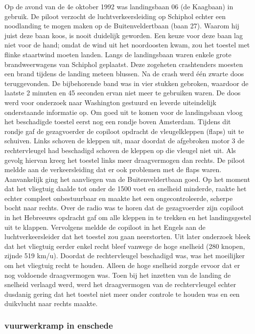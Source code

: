 Op de avond van de 4e oktober 1992 was landingsbaan 06 (de Kaagbaan) in gebruik. De piloot verzocht de luchtverkeersleiding op Schiphol echter een noodlanding te mogen maken op de Buitenveldertbaan (baan 27). Waarom hij juist deze baan koos, is nooit duidelijk geworden. Een keuze voor deze baan lag niet voor de hand; omdat de wind uit het noordoosten kwam, zou het toestel met flinke staartwind moeten landen. Langs de landingsbaan waren enkele grote brandweerwagens van Schiphol geplaatst. Deze zogeheten crashtenders moesten een brand tijdens de landing meteen blussen. Na de crash werd één zwarte doos teruggevonden. De bijbehorende band was in vier stukken gebroken, waardoor de laatste 2 minuten en 45 seconden ervan niet meer te gebruiken waren. De doos werd voor onderzoek naar Washington gestuurd en leverde uiteindelijk onderstaande informatie op.
Om goed uit te komen voor de landingsbaan vloog het beschadigde toestel eerst nog een rondje boven Amsterdam. Tijdens dit rondje gaf de gezagvoerder de copiloot opdracht de vleugelkleppen (flaps) uit te schuiven. Links schoven de kleppen uit, maar doordat de afgebroken motor 3 de rechtervleugel had beschadigd schoven de kleppen op die vleugel niet uit. Als gevolg hiervan kreeg het toestel links meer draagvermogen dan rechts. De piloot meldde aan de verkeersleiding dat er ook problemen met de flaps waren.
Aanvankelijk ging het aanvliegen van de Buitenveldertbaan goed. Op het moment dat het vliegtuig daalde tot onder de 1500 voet en snelheid minderde, raakte het echter compleet onbestuurbaar en maakte het een ongecontroleerde, scherpe bocht naar rechts. Over de radio was te horen dat de gezagvoerder zijn copiloot in het Hebreeuws opdracht gaf om alle kleppen in te trekken en het landingsgestel uit te klappen. Vervolgens meldde de copiloot in het Engels aan de luchtverkeersleider dat het toestel zou gaan neerstorten. Uit later onderzoek bleek dat het vliegtuig eerder enkel recht bleef vanwege de hoge snelheid (280 knopen, zijnde 519 km/u). Doordat de rechtervleugel beschadigd was, was het moeilijker om het vliegtuig recht te houden. Alleen de hoge snelheid zorgde ervoor dat er nog voldoende draagvermogen was. Toen bij het inzetten van de landing de snelheid verlaagd werd, werd het draagvermogen van de rechtervleugel echter dusdanig gering dat het toestel niet meer onder controle te houden was en een duikvlucht naar rechts maakte.

\cite{aviationsafety04101992airplaneCrashBijlmer}
\subsubsection{vuurwerkramp in enschede }

